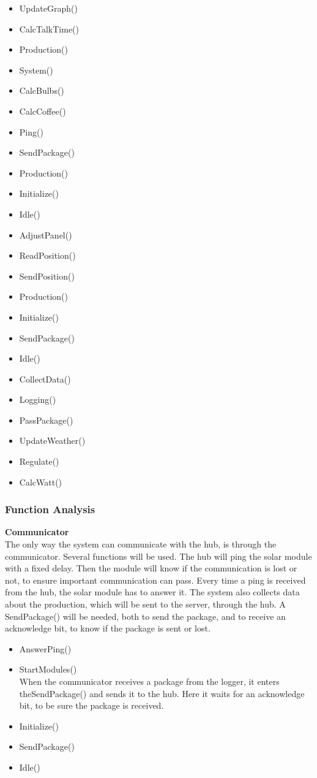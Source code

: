 \documentclass[12pt,a4paper]{report}
\begin{document}
\begin{itemize}
\item UpdateGraph()
\item CalcTalkTime()
\item Production()
\item System()
\item CalcBulbs()
\item CalcCoffee()
\item Ping()
\item SendPackage()
\item Production()
\item Initialize()
\item Idle()
\item AdjustPanel()
\item ReadPosition()
\item SendPosition()
\item Production()
\item Initialize()
\item SendPackage()
\item Idle()
\item CollectData()
\item Logging()
\item PassPackage()
\item UpdateWeather()
\item Regulate()
\item CalcWatt()
\end{itemize}

\subsubsection{Function Analysis}
\textbf{Communicator}\\
The only way the system can communicate with the hub, is through the communicator. Several functions will be used.
The hub will ping the solar module with a fixed delay. Then the module will know if the communication is lost or not, to ensure important communication can pass. Every time a ping is received from the hub, the solar module has to answer it.
The system also collects data about the production, which will be sent to the server, through the hub. A SendPackage() will be needed, both to send the package, and to receive an acknowledge bit, to know if the package is sent or lost.
\begin{itemize}
\item AnswerPing()
\item StartModules()
\\When the communicator receives a package from the logger, it enters theSendPackage() and sends it to the hub. Here it waits for an acknowledge bit, to be sure the package is received.
\item Initialize()
\item SendPackage()
\item Idle()
\end{itemize}
\end{document}

